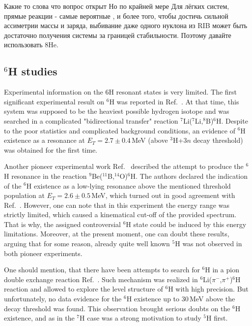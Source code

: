 Какие то слова что вопрос открыт
Но по крайней мере Для лёгких систем, прямые реакции - самые вероятные , и более того, чтобы достичь сильной ассиметрии массы и заряда, выбивание даже одного нуклона из RIB может быть достаточно получения системы за границей стабильности. Поэтому давайте использовать 8He. 


\subsection{$^{6}$H studies}

Experimental information on the 6H resonant states is very limited.
The first significant experimental result on $^{6}$H was reported in Ref.\ \cite{Aleksandrov:1984}.
At that time, this system was supposed to be the heaviest possible hydrogen isotope and was searched in a complicated "bidirectional transfer" reaction $^7$Li($^7$Li,$^8$B)$^6$H.
Despite to the poor statistics and complicated background conditions, an evidence of $^{6}$H existence as a resonance at $E_T= 2.7\pm 0.4$\,MeV (above $^3$H+$3n$ decay threshold) was obtained for the first time.

Another pioneer experimental work Ref.\ \cite{Belozyorov:1986} described the attempt to produce the $^{6}$H resonance in the reaction $^9$Be($^{11}$B,$^{14}$O)$^6$H.
The authors declared the indication of the $^{6}$H existence as a low-lying resonance above the mentioned threshold population at $E_T= 2.6\pm 0.5$\,MeV, which turned out in good agreement with Ref.\ \cite{Aleksandrov:1984}.
However, one can note that in this experiment the energy range was strictly limited, which caused a kinematical cut-off of the provided spectrum.
That is why, the assigned controversial $^{6}$H state could be induced by this energy limitations.
Moreover, at the present moment, one can doubt these results, arguing that for some reason, already quite well known $^{5}$H was not observed in both pioneer experiments.

One should mention, that there have been attempts to search for $^{6}$H in a pion double exchange reaction Ref.\ \cite{PARKER:1990483}.
Such mechanism was realized in $^6$Li($\pi ^{-}$,$\pi ^{+}$)$^{6}$H reaction and allowed to explore the level
structure of $^{6}$H with high precision. 
But unfortunately, no data evidence for the $^{6}$H existence up to 30\,MeV above the decay threshold was found.
This observation brought serious doubts on the $^{6}$H existence, and as in the $^{7}$H case was a strong motivation to study $^{5}$H first.

